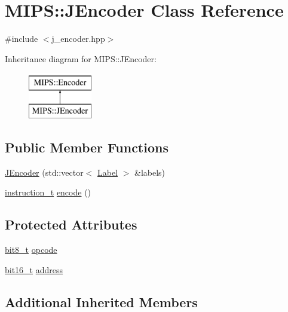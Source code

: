\hypertarget{classMIPS_1_1JEncoder}{}\section{M\+I\+PS\+:\+:J\+Encoder Class Reference}
\label{classMIPS_1_1JEncoder}


{\ttfamily \#include $<$j\+\_\+encoder.\+hpp$>$}

Inheritance diagram for M\+I\+PS\+:\+:J\+Encoder\+:\begin{figure}[H]
\begin{center}
\leavevmode
\includegraphics[height=2.000000cm]{classMIPS_1_1JEncoder}
\end{center}
\end{figure}
\subsection*{Public Member Functions}
\begin{DoxyCompactItemize}
\item 
\hyperlink{classMIPS_1_1JEncoder_afd3b10f842f961a7ee808450094613ee}{J\+Encoder} (std\+::vector$<$ \hyperlink{structMIPS_1_1Label}{Label} $>$ \&labels)
\item 
\hyperlink{core_8hpp_aa514fd240a0e29abb2a2e4c805d7f1a4}{instruction\+\_\+t} \hyperlink{classMIPS_1_1JEncoder_a0c2682f5d21da1e872675ccfe8995e62}{encode} ()
\end{DoxyCompactItemize}
\subsection*{Protected Attributes}
\begin{DoxyCompactItemize}
\item 
\hyperlink{core_8hpp_a6074bae122ae7b527864eec42c728c3c}{bit8\+\_\+t} \hyperlink{classMIPS_1_1JEncoder_a7c8a1750a88644f955501b841ea29490}{opcode}
\item 
\hyperlink{core_8hpp_adc265a970bc35995b5879784bbb3f1b7}{bit16\+\_\+t} \hyperlink{classMIPS_1_1JEncoder_a912e11de3756d2d4cb33cbdceb29b021}{address}
\end{DoxyCompactItemize}
\subsection*{Additional Inherited Members}


